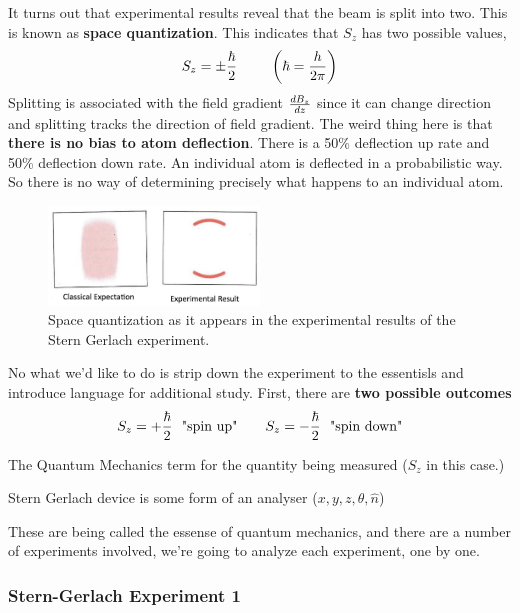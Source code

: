 \documentclass[english, 11pt]{article}
\begin{document}
       It turns out that experimental results reveal that the beam is split into two. This is known as \textbf{space quantization}. This indicates that $S_z$ has two possible values,
       \[ S_z = \pm \frac{\hbar}{2} \ \ \ \ \ \ \ \left( \hbar = \frac{h}{2\pi} \right) \]
       Splitting is associated with the field gradient $\frac{dB_z}{dz}$ since it can change direction and splitting tracks the direction of field gradient. The weird thing here is that \textbf{there is no bias to atom deflection}. There is a 50\% deflection up rate and 50\% deflection down rate. An individual atom is deflected in a probabilistic way. So there is no way of determining precisely what happens to an individual atom.

       \begin{figure}[t!]
          \centering
          \includegraphics[width=0.5\textwidth]{stern_gerlach_expect.png}
          \caption{Space quantization as it appears in the experimental results of the Stern Gerlach experiment.}
       \end{figure}

       No what we'd like to do is strip down the experiment to the essentisls and introduce language for additional study. First, there are \textbf{two possible outcomes}
       \[ S_z = + \f{\hbar}{2} \ \ \mbox{"spin up"} \ \ \ \ \ \ S_z = - \f{\hbar}{2} \ \ \mbox{"spin down"}  \]
       \begin{defn}[observable]\label{observable}
       The Quantum Mechanics term for the quantity being measured ($S_z$ in this case.)
       \end{defn}
       \begin{defn}[analyser]\label{analyser}
       Stern Gerlach device is some form of an analyser ($x, y, z, \theta, \hat{n}$)
       \end{defn}

       These are being called the essense of quantum mechanics, and there are a number of experiments involved, we're going to analyze each experiment, one by one.

       \subsubsection{Stern-Gerlach Experiment 1}
\end{document}

